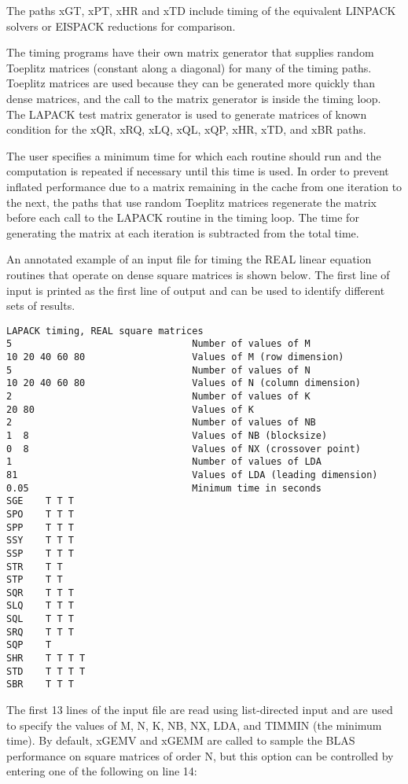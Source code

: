 \noindent
The paths xGT, xPT, xHR and xTD include timing of the equivalent
LINPACK solvers or EISPACK reductions for comparison.

The timing programs have their own matrix generator that supplies
random Toeplitz matrices (constant along a diagonal)
for many of the timing paths.
Toeplitz matrices are used because they can be generated more quickly
than dense matrices, and the call to the matrix generator is inside
the timing loop. 
The LAPACK test matrix generator is used to generate matrices of
known condition for the xQR, xRQ, xLQ, xQL, xQP, xHR, xTD, and xBR paths.

The user specifies a minimum time for which each routine should run
and the computation is repeated if necessary until this time is used.
In order to prevent inflated performance due to a matrix remaining
in the cache from one iteration to the next, the paths that use
random Toeplitz matrices regenerate the
matrix before each call to the LAPACK routine in the timing loop.
The time for generating the matrix at each iteration is subtracted
from the total time.

An annotated example of an input file for timing the
REAL linear equation routines that operate on dense square matrices is
shown below.
The first line of input is printed as the first line of
output and can be used to identify different sets of results.

\begin{verbatim}
LAPACK timing, REAL square matrices
5                                Number of values of M
10 20 40 60 80                   Values of M (row dimension)
5                                Number of values of N
10 20 40 60 80                   Values of N (column dimension)
2                                Number of values of K
20 80                            Values of K
2                                Number of values of NB
1  8                             Values of NB (blocksize)
0  8                             Values of NX (crossover point)
1                                Number of values of LDA
81                               Values of LDA (leading dimension)
0.05                             Minimum time in seconds
SGE    T T T
SPO    T T T
SPP    T T T
SSY    T T T
SSP    T T T
STR    T T
STP    T T
SQR    T T T
SLQ    T T T
SQL    T T T
SRQ    T T T
SQP    T
SHR    T T T T
STD    T T T T
SBR    T T T
\end{verbatim}
The first 13 lines of the input file are read using list-directed
input and are used to specify the values of M, N,
K, NB, NX, LDA, and TIMMIN (the minimum time). 
By default, xGEMV and xGEMM are called to sample the BLAS performance
on square matrices of order N, but this option can be
controlled by entering one of the following on line 14:

